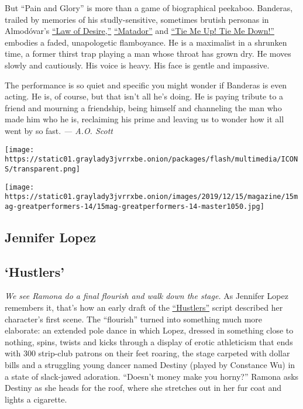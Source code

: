 But ``Pain and Glory'' is more than a game of biographical peekaboo.
Banderas, trailed by memories of his studly-sensitive, sometimes brutish
personas in Almodóvar's
\href{https://www.nytimes3xbfgragh.onion/1987/03/27/movies/new-directors-new-films-spanish-law-of-desire.html}{``Law
of Desire,''}
\href{https://www.nytimes3xbfgragh.onion/1988/09/16/movies/reviews-film-almodovar-s-matador-surrealist-sex-comedy.html}{``Matador''}
and
\href{https://www.nytimes3xbfgragh.onion/1990/05/04/movies/review-film-when-love-s-ties-are-real-ropes.html}{``Tie
Me Up! Tie Me Down!''} embodies a faded, unapologetic flamboyance. He is
a maximalist in a shrunken time, a former thirst trap playing a man
whose throat has grown dry. He moves slowly and cautiously. His voice is
heavy. His face is gentle and impassive.

The performance is so quiet and specific you might wonder if Banderas is
even acting. He is, of course, but that isn't all he's doing. He is
paying tribute to a friend and mourning a friendship, being himself and
channeling the man who made him who he is, reclaiming his prime and
leaving us to wonder how it all went by so fast. \emph{--- A.O. Scott}

\texttt{[image: https://static01.graylady3jvrrxbe.onion/packages/flash/multimedia/ICONS/transparent.png]}

\texttt{[image: https://static01.graylady3jvrrxbe.onion/images/2019/12/15/magazine/15mag-greatperformers-14/15mag-greatperformers-14-master1050.jpg]}

\hypertarget{jennifer-lopez}{%
\subsection{Jennifer Lopez}\label{jennifer-lopez}}

\hypertarget{hustlers}{%
\subsection{`Hustlers'}\label{hustlers}}

\emph{We see Ramona do a final flourish and walk down the stage.} As
Jennifer Lopez remembers it, that's how an early draft of the
\href{https://www.nytimes3xbfgragh.onion/2019/09/11/movies/hustlers-review.html}{``Hustlers''}
script described her character's first scene. The ``flourish'' turned
into something much more elaborate: an extended pole dance in which
Lopez, dressed in something close to nothing, spins, twists and kicks
through a display of erotic athleticism that ends with 300 strip-club
patrons on their feet roaring, the stage carpeted with dollar bills and
a struggling young dancer named Destiny (played by Constance Wu) in a
state of slack-jawed adoration. ``Doesn't money make you horny?'' Ramona
asks Destiny as she heads for the roof, where she stretches out in her
fur coat and lights a cigarette.

